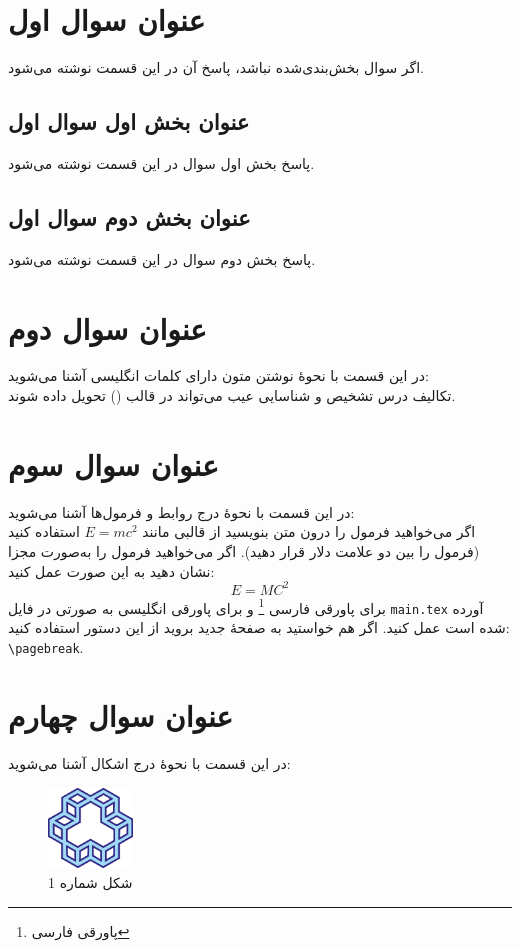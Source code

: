 \documentclass{article}
\begin{document}


\tableofcontents \clearpage
\listoffigures \clearpage
\listoftables \clearpage
\lstlistoflistings \clearpage
\newpage

\section{عنوان سوال اول}\label{Section1}
اگر سوال بخش‌بندی‌شده نباشد، پاسخ آن در این قسمت نوشته می‌شود.
\subsection{عنوان بخش اول سوال اول}
پاسخ بخش اول سوال در این قسمت نوشته می‌شود.
\subsection{عنوان بخش دوم سوال اول}
پاسخ بخش دوم سوال در این قسمت نوشته می‌شود.

\section{عنوان سوال دوم}
در این قسمت با نحوۀ نوشتن متون دارای کلمات انگلیسی آشنا می‌شوید:\\
\indent %
تکالیف درس تشخیص و شناسایی عیب می‌تواند در قالب
\lr{\LaTeX} ()
تحویل داده شوند.

\section{عنوان سوال سوم}
در این قسمت با نحوۀ درج روابط و فرمول‌ها آشنا می‌شوید:\\
\indent %
اگر می‌خواهید فرمول را درون متن بنویسید از قالبی مانند
$E = m{c}^{2}$
استفاده کنید (فرمول را بین دو علامت دلار قرار دهید).
اگر می‌خواهید فرمول را به‌صورت مجزا نشان دهید به این صورت عمل کنید:
\begin{equation}\label{eq1}
E=M C^2
\end{equation}
برای پاورقی فارسی%
\footnote{پاورقی فارسی}
و برای پاورقی انگلیسی%
به صورتی در فایل \verb|main.tex| آورده شده است عمل کنید.
اگر هم خواستید به صفحۀ جدید بروید از این دستور استفاده کنید: \verb|\pagebreak|.
\pagebreak
\section{عنوان سوال چهارم}
در این قسمت با نحوۀ درج اشکال آشنا می‌شوید:
\begin{figure}[h!]
    \centering
    \includegraphics[width=0.2\textwidth]{img/Logo.png}
    \caption{شکل شماره 1}
    \label{fig1}
\end{figure}
\end{document}
